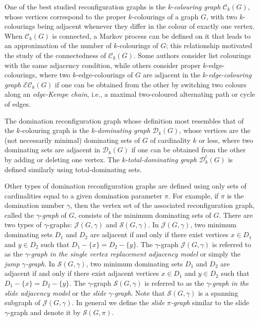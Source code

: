 \documentclass[12pt]{article}%
\begin{document}
One of the best studied reconfiguration graphs is the $k$-\emph{colouring
graph} $\mathcal{C}_{k}(G)$, whose vertices correspond to the proper
$k$-colourings of a graph $G$, with two $k$-colourings being adjacent whenever
they differ in the colour of exactly one vertex. When $\mathcal{C}_{k}(G)$ is
connected, a Markov process can be defined on it that leads to an
approximation of the number of $k$-colourings of $G$; this relationship
motivated the study of the connectedness of $\mathcal{C}_{k}(G)$. Some authors
consider list colourings with the same adjacency condition, while others
consider proper $k$-edge-colourings, where two $k$-edge-colourings of $G$ are
adjacent in the $k$-\emph{edge-colouring graph} $\mathcal{EC}_{k}(G)$ if one
can be obtained from the other by switching two colours along an
\emph{edge-Kempe chain}, i.e., a maximal two-coloured alternating path or
cycle of edges.

The domination reconfiguration graph whose definition most resembles that of
the $k$-colouring graph is the $k$-\emph{dominating graph} $\mathcal{D}%
_{k}(G)$, whose vertices are the (not necessarily minimal) dominating sets of
$G$ of cardinality $k$ or less, where two dominating sets are adjacent in
$\mathcal{D}_{k}(G)$ if one can be obtained from the other by adding or
deleting one vertex. The $k$-\emph{total-dominating graph} $\mathcal{D}%
_{k}^{t}(G)$ is defined similarly using total-dominating sets.

Other types of domination reconfiguration graphs are defined using only sets
of cardinalities equal to a given domination parameter $\pi$. For example, if
$\pi$ is the domination number $\gamma$, then the vertex set of the associated
reconfiguration graph, called the $\gamma$-\emph{graph} of $G$, consists of
the minimum dominating sets of $G$. There are two types of $\gamma$-graphs:
$\mathcal{J}(G,\gamma)$ and $\mathcal{S}(G,\gamma)$. In $\mathcal{J}%
(G,\gamma)$, two minimum dominating sets $D_{1}$ and $D_{2}$ are adjacent if
and only if there exist vertices $x\in D_{1}$ and $y\in D_{2}$ such that
$D_{1}-\{x\}=D_{2}-\{y\}$. The $\gamma$-graph $\mathcal{J}(G,\gamma)$ is
referred to as the $\gamma$-\emph{graph in the single vertex replacement
adjacency model} or simply the \emph{jump }$\gamma$\emph{-graph}. In
$\mathcal{S}(G,\gamma)$, two minimum dominating sets $D_{1}$ and $D_{2}$ are
adjacent if and only if there exist adjacent vertices $x\in D_{1}$ and $y\in
D_{2}$ such that $D_{1}-\{x\}=D_{2}-\{y\}$. The $\gamma$-graph $\mathcal{S}%
(G,\gamma)$ is referred to as the $\gamma$-\emph{graph in the slide adjacency
model} or the \emph{slide }$\gamma$\emph{-graph}. Note that $\mathcal{S}%
(G,\gamma)$ is a spanning subgraph of $\mathcal{J}(G,\gamma)$. In general we
define the \emph{slide }$\pi$\emph{-graph} similar to the slide $\gamma$-graph
and denote it by $\mathcal{S}(G,\pi)$.
\end{document}
